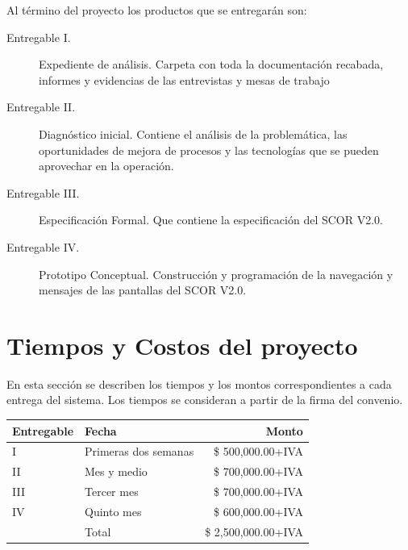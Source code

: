 \documentclass[10pt]{book}
\begin{document}
	Al término del proyecto los productos que se entregarán son:
	
\begin{description}
	\item [Entregable I.] Expediente de análisis. Carpeta con toda la documentación recabada, informes y evidencias de las entrevistas y mesas de trabajo
	\item [Entregable II.] Diagnóstico inicial. Contiene el análisis de la problemática, las oportunidades de mejora de procesos y las tecnologías que se pueden aprovechar en la operación.
	\item [Entregable III.] Especificación Formal. Que contiene la especificación del SCOR V2.0.
	\item [Entregable IV.] Prototipo Conceptual. Construcción y programación de la navegación y mensajes de las pantallas del SCOR V2.0.
\end{description}


\section{Tiempos y Costos del proyecto}

	En esta sección se describen los tiempos y los montos correspondientes a cada entrega del sistema. Los  tiempos se consideran a partir de la firma del convenio.\\

\begin{tabular}{|l | l | r|}
	\hline
	{\bf Entregable}& {\bf Fecha} &{\bf Monto}  \\
	\hline
	I & Primeras dos semanas  & \$ 500,000.00+IVA\\
	\hline
	II & Mes y medio & \$ 700,000.00+IVA\\
	\hline
	III & Tercer mes & \$ 700,000.00+IVA\\
	\hline
	IV & Quinto mes & \$ 600,000.00+IVA\\
	\hline
	\hline
	 & Total & \$ 2,500,000.00+IVA\\
	\hline
\end{tabular}

\clossing
\end{document}
